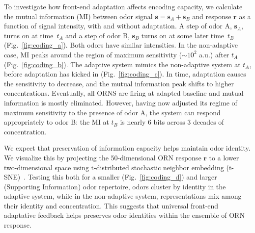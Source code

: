 \documentclass[9pt,twocolumn,twoside,lineno]{pnas-new}
\begin{document}
To investigate how front-end adaptation affects encoding capacity, we calculate the mutual information (MI) between odor signal $\mathbf s=\mathbf s_A +\mathbf s_B$ and response $\mathbf r$ as a function of signal intensity, with and without adaptation. A step of odor A, $\textbf{s}_A$,  turns on at time~$t_A$ and a step of odor B, $\mathbf s_B$ turns on at some later time~$t_B$ (Fig.~\ref{fig:coding_a}). Both odors have similar intensities. In the non-adaptive case, MI peaks around the region of maximum sensitivity ($\sim 10^2$ a.u.) after $t_A$ (Fig.~\ref{fig:coding_b}). The adaptive system mimics the non-adaptive system at $t_A$,  before adaptation has kicked in (Fig.~\ref{fig:coding_c}). In time, adaptation causes the sensitivity to decrease, %
and the mutual information peak shifts to higher concentrations. Eventually, all ORNS are firing at adapted baseline and mutual information is mostly eliminated. However, having now adjusted its regime of maximum sensitivity to the presence of odor A, the system can respond appropriately to odor B: the MI at $t_B$ is nearly 6 bits across 3 decades of concentration.

We expect that preservation of information capacity helps maintain  odor identity. We visualize this by projecting the 50-dimensional ORN  response $\mathbf r$ to a lower two-dimensional space using t-distributed stochastic neighbor embedding (t-SNE)~\cite{tsne}. Testing this both for a smaller (Fig.~\ref{fig:coding_d}) and larger (Supporting Information) odor repertoire, odors cluster by identity in the adaptive system, while in the non-adaptive system, representations  mix among their identity and concentration. This suggests that universal front-end adaptative feedback helps preserves odor identities within the ensemble of ORN response.

\end{document}
